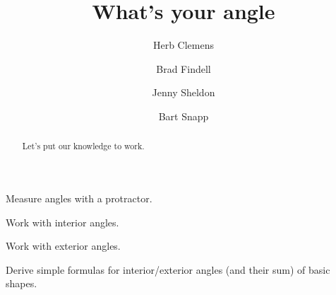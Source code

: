 \documentclass[nooutcomes,noauthor,hints,handout]{ximera}
\title{What's your angle}
\author{Herb Clemens \and Brad Findell \and Jenny Sheldon \and Bart Snapp}
\begin{document}
\begin{abstract}
  Let's put our knowledge to work. 
\end{abstract}
\maketitle


\begin{listOutcomes}
\item Measure angles with a protractor.
\item Work with interior angles.
\item Work with exterior angles.
\item Derive simple formulas for interior/exterior angles (and their
  sum) of basic shapes.
\end{listOutcomes}

\mynewpage



 
       
\end{document}
